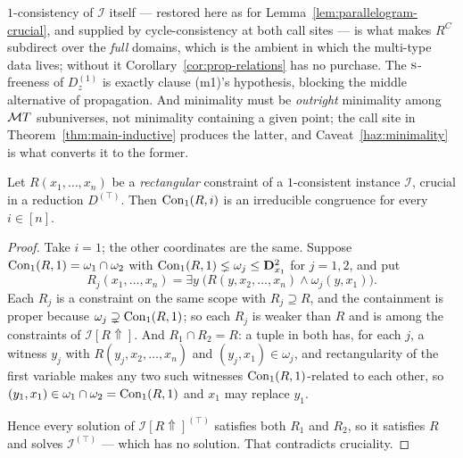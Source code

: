 \begin{hazard}\label{haz:minimal-consistent}
$1$-consistency of $\mathcal I$ itself --- restored here as for
Lemma~\ref{lem:parallelogram-crucial}, and supplied by cycle-consistency at
both call sites --- is what makes $R^{C}$ subdirect over the \emph{full}
domains, which is the ambient in which the multi-type data lives; without it
Corollary~\ref{cor:prop-relations} has no purchase. The $\textup{\textsc{s}}$-freeness of
$D^{(1)}_{z}$ is exactly clause (m1)'s hypothesis, blocking the middle
alternative of propagation. And minimality must be \emph{outright}
minimality among $\mathcal MT$ subuniverses, not minimality containing a given
point; the call site in Theorem~\ref{thm:main-inductive} produces the
latter, and Caveat~\ref{haz:minimality} is what converts it to the former.
\end{hazard}

\begin{lemma}\label{lem:crucial-irreducible}
Let $R(x_{1},\dots,x_{n})$ be a \emph{rectangular} constraint of a
$1$-consistent instance $\mathcal I$, crucial in a reduction $D^{(\top)}$. Then
$\operatorname{Con}_1(R,i)$ is an irreducible congruence for every $i\in[n]$.
\end{lemma}

\begin{proof}
Take $i=1$; the other coordinates are the same. Suppose
$\operatorname{Con}_1(R,1)=\omega_{1}\cap\omega_{2}$ with
$\operatorname{Con}_1(R,1)\lneq\omega_{j}\le\mathbf D_{x_{1}}^{2}$ for $j=1,2$, and put
\[
  R_{j}(x_{1},\dots,x_{n})=\exists y\;
    \bigl(R(y,x_{2},\dots,x_{n})\wedge\omega_{j}(y,x_{1})\bigr).
\]
Each $R_{j}$ is a constraint on the same scope with
$R_{j}\supseteq R$, and the containment is proper because
$\omega_{j}\supsetneq\operatorname{Con}_1(R,1)$; so each $R_{j}$ is weaker than $R$ and is
among the constraints of $\mathcal I[R\Uparrow]$. And
$R_{1}\cap R_{2}=R$: a tuple in both has, for each $j$, a witness $y_{j}$ with
$R(y_{j},x_{2},\dots,x_{n})$ and $(y_{j},x_{1})\in\omega_{j}$, and rectangularity
of the first variable makes any two such witnesses $\operatorname{Con}_1(R,1)$-related to
each other, so $(y_{1},x_{1})\in\omega_{1}\cap\omega_{2}=\operatorname{Con}_1(R,1)$ and
$x_{1}$ may replace $y_{1}$.

Hence every solution of $\mathcal I[R\Uparrow]^{(\top)}$ satisfies both $R_{1}$
and $R_{2}$, so it satisfies $R$ and solves $\mathcal I^{(\top)}$ --- which has
no solution. That contradicts cruciality.
\end{proof}

